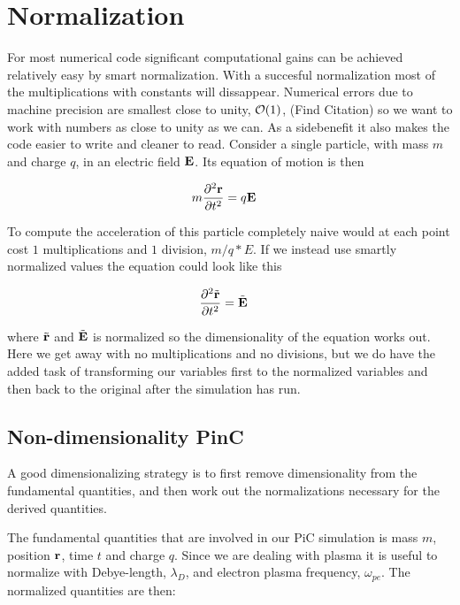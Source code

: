 \section{Normalization}
    For most numerical code significant computational gains can be achieved
    relatively easy by smart normalization. With a succesful normalization most
    of the multiplications with constants will dissappear. Numerical errors
    due to machine precision are smallest close to unity, \(\order{1}\), (Find Citation) so we
    want to work with numbers as close to unity as we can. As a sidebenefit it also
    makes the code easier to write and cleaner to read. Consider a single particle,
    with mass \(m\) and charge \(q\), in an electric field \(\vb{E}\). Its equation of motion is then

    \begin{align}
        m\pdv[2]{\vb{r}}{t} &= q\vb{E}
    \end{align}

    To compute the acceleration of this particle completely naive would at each point
    cost \(1\) multiplications and \(1\) division, \(m/q*E\). If we instead use smartly normalized
    values the equation could look like this

    \begin{align}
        \pdv[2]{\tilde {\vb{r}}}{t} &= \tilde{\vb{E}}
    \end{align}

    where \(\tilde {\vb{r}}\) and \(\tilde{\vb{E}}\) is normalized so the dimensionality of the
    equation works out. Here we get away with no multiplications and no divisions,
    but we do have the added task of transforming our variables first to the normalized variables
    and then back to the original after the simulation has run.

    \subsection{Non-dimensionality PinC}
        A good dimensionalizing strategy is to first remove
        dimensionality from the fundamental quantities, and then work out the
        normalizations necessary for the derived quantities.

        The fundamental quantities that are involved in our PiC simulation is
        mass \(m\), position \(\vb{r}\), time \(t\) and charge \(q\). Since we are dealing with
        plasma it is useful to normalize with Debye-length, \(\lambda_D\), and electron plasma frequency, \(\omega_{pe}\).
        The normalized quantities are then:

